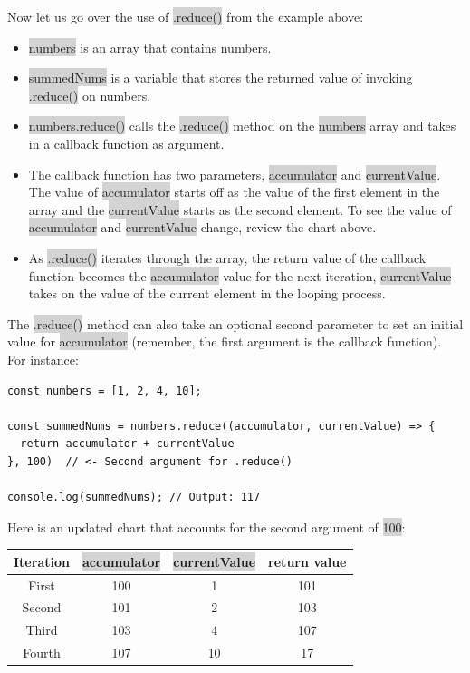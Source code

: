 \documentclass[11pt]{article}
\begin{document}
Now let us go over the use of \colorbox{lightgray}{.reduce()} from the example above:
\begin{itemize}[leftmargin = *]
\item \colorbox{lightgray}{numbers} is an array that contains numbers.
\item \colorbox{lightgray}{summedNums} is a variable that stores the returned value of invoking \colorbox{lightgray}{.reduce()} on numbers.
\item \colorbox{lightgray}{numbers.reduce()} calls the \colorbox{lightgray}{.reduce()} method on the \colorbox{lightgray}{numbers} array and takes in a callback function as argument.
\item The callback function has two parameters, \colorbox{lightgray}{accumulator} and \colorbox{lightgray}{currentValue}. The value of \colorbox{lightgray}{accumulator} starts off as the value of the first element in the array and the \colorbox{lightgray}{currentValue} starts as the second element. To see the value of \colorbox{lightgray}{accumulator} and \colorbox{lightgray}{currentValue} change, review the chart above.
\item As \colorbox{lightgray}{.reduce()} iterates through the array, the return value of the callback function becomes the \colorbox{lightgray}{accumulator} value for the next iteration, \colorbox{lightgray}{currentValue} takes on the value of the current element in the looping process.
\end{itemize}
The \colorbox{lightgray}{.reduce()} method can also take an optional second parameter to set an initial value for \colorbox{lightgray}{accumulator} (remember, the first argument is the callback function). For instance:
\begin{lstlisting}
const numbers = [1, 2, 4, 10];

const summedNums = numbers.reduce((accumulator, currentValue) => {
  return accumulator + currentValue
}, 100)  // <- Second argument for .reduce()

console.log(summedNums); // Output: 117
\end{lstlisting}
Here is an updated chart that accounts for the second argument of \colorbox{lightgray}{100}:

\begin{center}
\begin{tabular}[H]{ |c|c|c|c| } 
 \hline
 Iteration & \colorbox{lightgray}{accumulator} & \colorbox{lightgray}{currentValue} & return value \\ 
 \hline
 First & 100 & 1 & 101 \\ 
 \hline
 Second & 101 & 2 & 103\\ 
 \hline
 Third & 103 & 4 & 107\\
 \hline
 Fourth & 107 & 10 & 17 \\
 \hline
\end{tabular}
\end{center}
\end{document}
